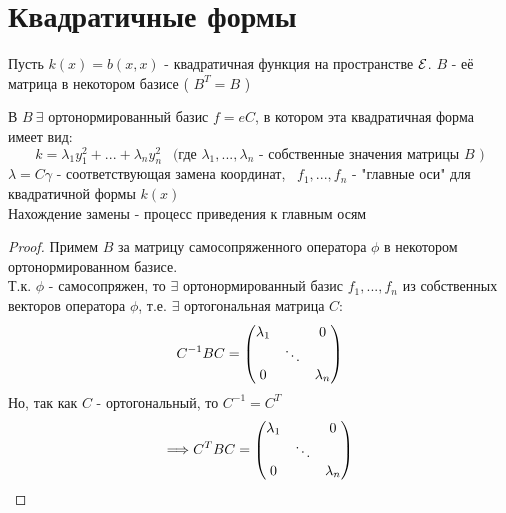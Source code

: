 \section{Квадратичные формы}
Пусть $k(x) = b(x,x)$ - квадратичная функция на пространстве $\mathcal{E}$. $B$ - её матрица в некотором базисе  ( $B^T =B$ )
\begin{theorem}
    В $B \ \exists$ ортонормированный базис $f = eC$, в котором эта квадратичная форма имеет вид: 
    $$k = \lambda_1y_1^2 + ... + \lambda_ny_n^2 \ \ \text{ (где $\lambda_1,...,\lambda_n$ - собственные значения матрицы $B$ )}$$
    $\lambda = C \gamma$ - соответствующая замена координат, \ $f_1,...,f_n$ - "главные оси" для квадратичной формы $k(x)$\\
    Нахождение замены - процесс приведения к главным осям 
\end{theorem} 
\begin{proof}
    Примем $B$ за матрицу самосопряженного оператора $\phi$ в некотором ортонормированном базисе.\\
    Т.к. $\phi$ - самосопряжен, то $\exists$ ортонормированный базис $f_1,...,f_n$ из собственных векторов оператора $\phi$, т.е. $\exists$ ортогональная матрица $C$:
    $$C^{-1}BC = \begin{pmatrix}
        \lambda_1 & \null & 0 \\ \null & \ddots \\ 0 & \null & \lambda_n
    \end{pmatrix}$$
    Но, так как $C$ - ортогональный, то $C^{-1} = C^T$ 
    $$\Longrightarrow C^TBC = \begin{pmatrix}
        \lambda_1 & \null & 0 \\ \null & \ddots \\ 0 & \null & \lambda_n
    \end{pmatrix}$$        
\end{proof} 

 
 